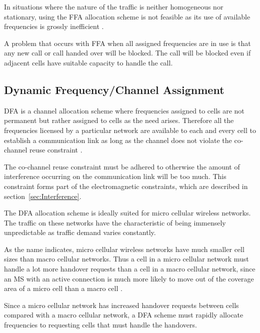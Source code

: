 In situations where the nature of the traffic is neither homogeneous nor stationary, using the \gls{FFA} allocation scheme is not feasible as its use of available frequencies is grossly inefficient \cite{PrinciplesMobileCommunication}.

A problem that occurs with \gls{FFA} when all assigned frequencies are in use is that any new call or call handed over will be blocked\cite{PrinciplesMobileCommunication}. The call will be blocked even if adjacent cells have suitable capacity to handle the call\cite{PrinciplesMobileCommunication}.

\subsection{Dynamic Frequency/Channel Assignment}
\gls{DFA} is a channel allocation scheme where frequencies assigned to cells are not permanent but rather assigned to cells as the need arises\cite{PrinciplesMobileCommunication}. Therefore all the frequencies licensed by a particular network are available to each and every cell to establish a communication link as long as the channel does not violate the co-channel reuse constraint \cite{PrinciplesMobileCommunication}. 

The co-channel reuse constraint must be adhered to otherwise the amount of interference occurring on the communication link will be too much\cite{PrinciplesMobileCommunication}. This constraint forms part of the electromagnetic constraints, which are described in section~\ref{sec:Interference}.

The \gls{DFA} allocation scheme is ideally suited for micro cellular wireless networks. The traffic on these networks have the characteristic of being immensely unpredictable as traffic demand varies constantly\cite{PrinciplesMobileCommunication,WirelessCommunications,MobileWirelessCommunications}.

As the name indicates, micro cellular wireless networks have much smaller cell sizes than macro cellular networks. Thus a cell in a micro cellular network must handle a lot more handover requests than a cell in a macro cellular network, since an \gls{MS} with an active connection is much more likely to move out of the coverage area of a micro cell than a macro cell \cite{PrinciplesMobileCommunication,WirelessCommunications,MobileWirelessCommunications}.

Since a micro cellular network has increased handover requests between cells compared with a macro cellular network, a \gls{DFA} scheme must rapidly allocate frequencies to requesting cells that must handle the handovers\cite{PrinciplesMobileCommunication,WirelessCommunications,MobileWirelessCommunications}.

